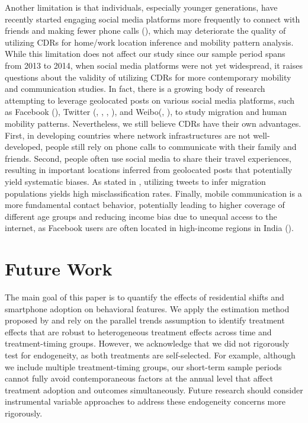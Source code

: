 Another limitation is that individuals, especially younger generations, have recently started engaging social media platforms more frequently to connect with friends and making fewer phone calls (\cite{garrett2023linking}), which may deteriorate the quality of utilizing CDRs for home/work location inference and mobility pattern analysis.
While this limitation does not affect our study since our sample period spans from 2013 to 2014, when social media platforms were not yet widespread, it raises questions about the validity of utilizing CDRs for more contemporary mobility and communication studies.
In fact, there is a growing body of research attempting to leverage geolocated posts on various social media platforms, such as Facebook (\cite{sahai2022social}), Twitter (\cite{zagheni2014inferring}, \cite{hawelka2014geo}, \cite{jurdak2015understanding}, \cite{luo2016explore}), and Weibo(\cite{cui2018social}, \cite{ebrahimpour2020analyzing}), to study migration and human mobility patterns.
Nevertheless, we still believe CDRs have their own advantages.
First, in developing countries where network infrastructures are not well-developed, people still rely on phone calls to communicate with their family and friends.
Second, people often use social media to share their travel experiences, resulting in important locations inferred from geolocated posts that potentially yield systematic biases. As stated in \cite{armstrong2021challenges}, utilizing tweets to infer migration populations yields high misclassification rates.
Finally, mobile communication is a more fundamental contact behavior, potentially leading to higher coverage of different age groups and reducing income bias due to unequal access to the internet, as Facebook users are often located in high-income regions in India (\cite{sahai2022social}).

\section{Future Work}
The main goal of this paper is to quantify the effects of residential shifts and smartphone adoption on behavioral features.
We apply the estimation method proposed by \cite{callaway2021difference} and rely on the parallel trends assumption to identify treatment effects that are robust to heterogeneous treatment effects across time and treatment-timing groups.
However, we acknowledge that we did not rigorously test for endogeneity, as both treatments are self-selected.
For example, although we include multiple treatment-timing groups, our short-term sample periods cannot fully avoid contemporaneous factors at the annual level that affect treatment adoption and outcomes simultaneously.
Future research should consider instrumental variable approaches to address these endogeneity concerns more rigorously.
